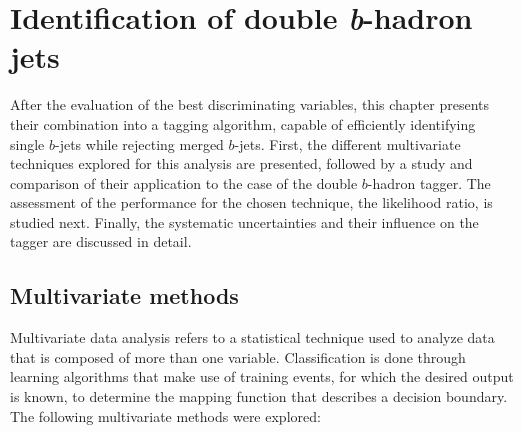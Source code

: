 %
\chapter{Identification of double \emph{\textbf{b}}-hadron jets}\label{ch:mva}
%

After the evaluation of the best discriminating variables, this chapter presents their combination into a tagging algorithm, capable of efficiently identifying single $b$-jets while rejecting merged $b$-jets. First, the different multivariate techniques explored for this analysis are presented, followed by a study and comparison of their application to the case of the double $b$-hadron tagger. The assessment of the performance for the chosen technique, the likelihood ratio, is studied next. Finally, the systematic uncertainties and their influence on the tagger are discussed in detail.

\section{Multivariate methods}\label{sec:mvamethods}

Multivariate data analysis refers to a statistical technique used to analyze data that %
 is composed of more than one variable.  Classification is done through learning algorithms that make use of training events,  for which the desired output is known, to determine the mapping function that describes a decision boundary. The following multivariate methods were explored: %

